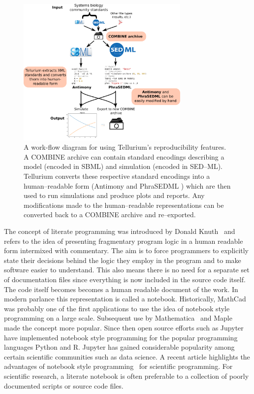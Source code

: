 \documentclass[10pt,letterpaper]{article}
\begin{document}
\begin{figure}
  \includegraphics[width=0.75\textwidth]{fig-workflow.pdf}
  \caption{A work-flow diagram for using Tellurium's reproducibility features. A COMBINE archive can contain standard encodings describing a model (encoded in SBML) and simulation (encoded in SED--ML). Tellurium converts these respective standard encodings into a human--readable form (Antimony \cite{smith2009antimony} and PhraSEDML \cite{choi2016phrased}) which are then used to run simulations and produce plots and reports. Any modifications made to the human--readable representations can be converted back to a COMBINE archive and re--exported.}
  \label{fig:workflow}
\end{figure}

The concept of literate programming was introduced by Donald Knuth~\cite{knuth84literate} and refers to the idea of presenting fragmentary program logic in a human readable form intermixed with commentary. The aim is to force programmers to explicitly state their decisions behind the logic they employ in the program and to make software easier to understand. This also means there is no need for a separate set of documentation files since everything is now included in the source code itself. The code itself becomes becomes a human readable document of the work. In modern parlance this representation is called a notebook. Historically, MathCad~\cite{MathCAD} was probably one of the first applications to use the idea of notebook style programming on a large scale. Subsequent use by Mathematica~\cite{wolfram1996mathematica} and Maple~\cite{maple} made the concept more popular. Since then open source efforts such as Jupyter~\cite{ragan2014jupyter} have implemented notebook style programming for the popular programming languages Python and R. Jupyter has gained considerable popularity among certain scientific communities such as data science. A recent article highlights the advantages of notebook style programming~\cite{shen2014interactive} for scientific programming. For scientific research, a literate notebook is often preferable to a collection of poorly documented scripts or source code files.
\end{document}
